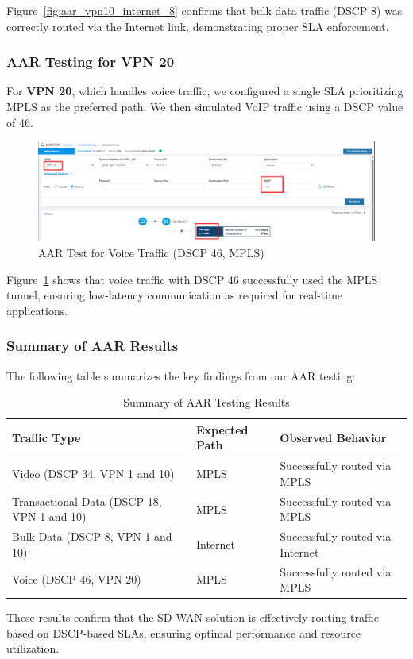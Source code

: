 \documentclass[12pt,english]{report}
\begin{document}
Figure~\ref{fig:aar_vpn10_internet_8} confirms that bulk data traffic (DSCP 8) was correctly routed via the Internet link, demonstrating proper SLA enforcement.

\subsubsection{AAR Testing for VPN 20}

For \textbf{VPN 20}, which handles voice traffic, we configured a single SLA prioritizing MPLS as the preferred path. We then simulated VoIP traffic using a DSCP value of 46.

\begin{figure}[H]
    \centering
    \includegraphics[width=1\textwidth]{chapter 4/vpn20_46.png}
    \caption{AAR Test for Voice Traffic (DSCP 46, MPLS)}
    \label{fig:aar_vpn20_mpls_46}
\end{figure}

Figure~\ref{fig:aar_vpn20_mpls_46} shows that voice traffic with DSCP 46 successfully used the MPLS tunnel, ensuring low-latency communication as required for real-time applications.

\subsubsection{Summary of AAR Results}

The following table summarizes the key findings from our AAR testing:

\begin{table}[h]
    \centering
    \footnotesize
    \caption{Summary of AAR Testing Results}
    \label{tab:aar_results}
    \begin{tabularx}{\linewidth}{@{}>{\centering\arraybackslash}p{5cm}>{\centering\arraybackslash}p{3cm}>{\raggedright\arraybackslash}X@{}}
        \toprule
        \textbf{Traffic Type} & \textbf{Expected Path} & \textbf{Observed Behavior} \\
        \midrule
        Video (DSCP 34, VPN 1 and 10) & MPLS & Successfully routed via MPLS \\
        \midrule
        Transactional Data (DSCP 18, VPN 1 and 10) & MPLS & Successfully routed via MPLS \\
        \midrule
        Bulk Data (DSCP 8, VPN 1 and 10) & Internet & Successfully routed via Internet \\
        \midrule
        Voice (DSCP 46, VPN 20) & MPLS & Successfully routed via MPLS \\
        \bottomrule
    \end{tabularx}
\end{table}
These results confirm that the SD-WAN solution is effectively routing traffic based on DSCP-based SLAs, ensuring optimal performance and resource utilization.
\end{document}
